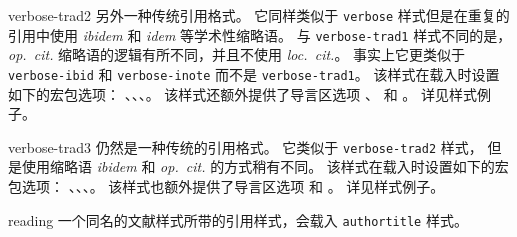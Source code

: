 \begin{marglist}
\item[verbose-trad2]
另外一种传统引用格式。
它同样类似于 \texttt{verbose} 样式但是在重复的引用中使用 \emph{ibidem} 和 \emph{idem} 等学术性缩略语。
与 \texttt{verbose-trad1} 样式不同的是，
\emph{op.~cit.} 缩略语的逻辑有所不同，并且不使用 \emph{loc.~cit.}。
事实上它更类似于 \texttt{verbose-ibid} 和 \texttt{verbose-inote} 而不是 \texttt{verbose-trad1}。
该样式在载入时设置如下的宏包选项：
、、、。
该样式还额外提供了导言区选项 、 和 。
详见样式例子。

\item[verbose-trad3]
仍然是一种传统的引用格式。
它类似于 \texttt{verbose-trad2} 样式，
但是使用缩略语 \emph{ibidem} 和 \emph{op.~cit.} 的方式稍有不同。
该样式在载入时设置如下的宏包选项：
、、、。
该样式也额外提供了导言区选项  和 。
详见样式例子。

\item[reading]
一个同名的文献样式所带的引用样式，会载入 \texttt{authortitle} 样式。

\end{marglist}

